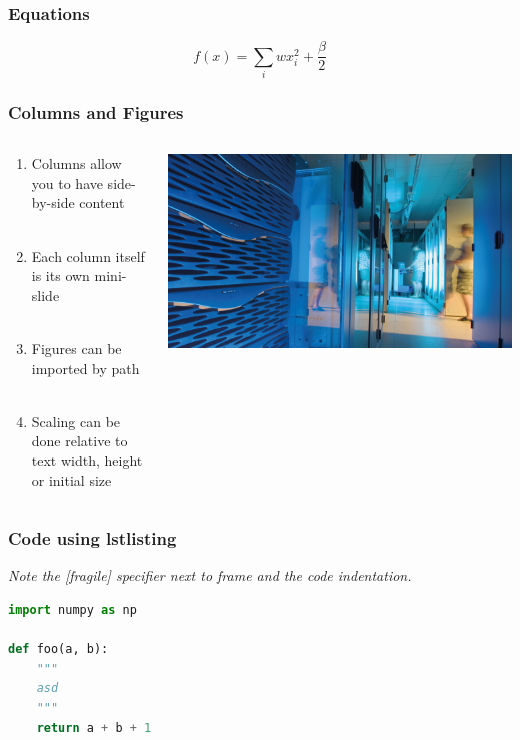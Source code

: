 \documentclass[aspectratio=1610]{beamer}
\begin{document}
\begin{frame}
\frametitle{Equations}

    \begin{equation*}
        f(x) = \sum_i wx_i^2 + \frac{\beta}{2}
    \end{equation*}
\end{frame}


\begin{frame}
    \frametitle{Columns and Figures}

    \begin{columns}
        \begin{column}{0.4\textwidth}
            \begin{enumerate}
                \item Columns allow you to have side-by-side content\\~
                \item Each column itself is its own mini-slide\\~
                \item Figures can be imported by path\\~
                \item Scaling can be done relative to text width, height or initial size
            \end{enumerate}
        \end{column}
        \begin{column}{0.4\textwidth}
            \centering
            \includegraphics[width=\textwidth]{logos/hgf_key_technologies.jpg}
        \end{column}
    \end{columns}
\end{frame}

\begin{frame}[fragile]
    \frametitle{Code using lstlisting}

    \emph{Note the [fragile] specifier next to frame and the code indentation.}

\begin{lstlisting}[language=Python]
import numpy as np

def foo(a, b):
    """
    asd
    """
    return a + b + 1
\end{lstlisting}

\end{frame}
\end{document}
